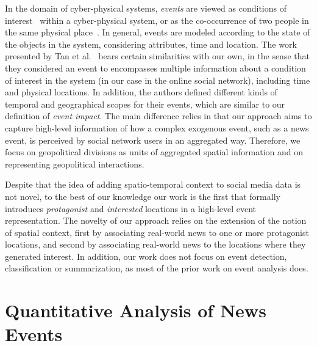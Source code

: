 In the domain of cyber-physical systems, {\em events} are viewed as
conditions of interest~\cite{st-model_2009} within a
cyber-physical system, or as the co-occurrence of two people in the same
physical place~\cite{STEvent_2010}.  In general, events are modeled
according to the state of the objects in the system, considering attributes,
time and location.  The work presented by Tan et al.~\cite{st-model_2009} bears
certain similarities with our own, in the sense that they considered an event
to encompasses multiple information about a condition of interest in the system (in our
case in the online social network), including time and physical
locations. In addition, the authors defined different kinds of temporal and
geographical scopes for their events, which are similar to our definition of
{\em event impact}. The main difference relies in that our approach aims to
capture
high-level information of how a complex exogenous event, such as a news
event, is perceived by social network users in an aggregated way. Therefore,
we focus on geopolitical divisions as units of aggregated spatial
information and on representing geopolitical interactions.

Despite that the idea of adding spatio-temporal context to social media data
is not novel, to the best of our knowledge our work is the first that
formally introduces {\em protagonist} and {\em interested} locations in a high-level
event representation.  The novelty of our approach relies on the extension
of the notion of spatial context, first by associating real-world news to
one or more protagonist locations, and second by associating real-world news
to the locations where they generated interest.  In addition, our work does
not focus on event detection, classification or summarization, as most
of the prior work on event analysis does.


\section{Quantitative Analysis of News Events}
